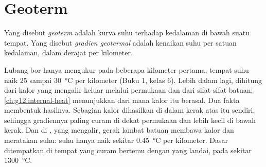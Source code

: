 \section{Geoterm}

\begin{definition}\label{def:g11:lithosphere-asthenosphere:geotherm}
Yang disebut \emph{geoterm} adalah kurva suhu terhadap kedalaman
di bawah suatu tempat. Yang disebut
\emph{gradien geotermal} adalah kenaikan suhu per satuan kedalaman, dalam derajat per kilometer.
\end{definition}

Lubang bor hanya mengukur  pada beberapa kilometer pertama, tempat suhu
naik 25 sampai \qty{30}{\celsius} per kilometer (Buku 1, kelas 6). Lebih dalam
lagi,  dihitung dari kalor yang mengalir keluar melalui permukaan dan
dari sifat-sifat batuan; \cref{ch:g12:internal-heat} menunjukkan dari mana kalor
itu berasal. Dua fakta membentuk hasilnya. Sebagian kalor dihasilkan di dalam
kerak atas itu sendiri, sehingga gradiennya paling curam di dekat permukaan dan
lebih kecil di bawah kerak. Dan di , yang mengalir, gerak lambat
batuan membawa kalor dan meratakan suhu: suhu hanya naik sekitar
\qty{0.45}{\celsius} per kilometer. Dasar  ditempatkan di tempat 
 yang curam bertemu dengan   yang landai, pada sekitar
\qty{1300}{\celsius}.


